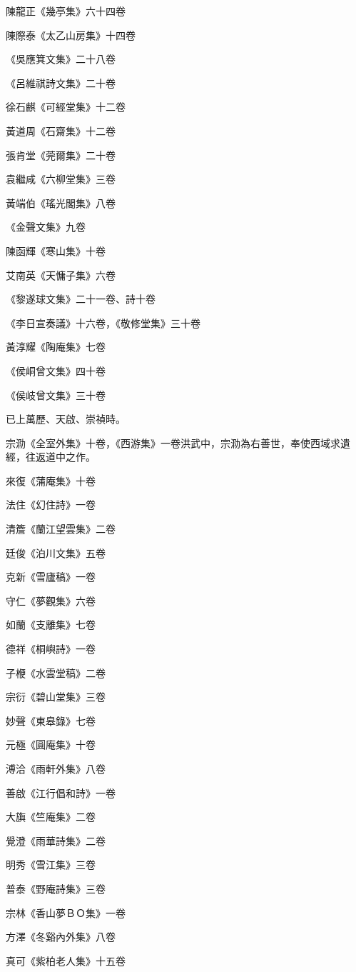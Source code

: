 陳龍正《幾亭集》六十四卷

陳際泰《太乙山房集》十四卷

《吳應箕文集》二十八卷

《呂維祺詩文集》二十卷

徐石麒《可經堂集》十二卷

黃道周《石齋集》十二卷

張肯堂《莞爾集》二十卷

袁繼咸《六柳堂集》三卷

黃端伯《瑤光閣集》八卷

《金聲文集》九卷

陳函輝《寒山集》十卷

艾南英《天慵子集》六卷

《黎遂球文集》二十一卷、詩十卷

《李日宣奏議》十六卷，《敬修堂集》三十卷

黃淳耀《陶庵集》七卷

《侯峒曾文集》四十卷

《侯岐曾文集》三十卷

已上萬歷、天啟、崇禎時。

宗泐《全室外集》十卷，《西游集》一卷洪武中，宗泐為右善世，奉使西域求遺經，往返道中之作。

來復《蒲庵集》十卷

法住《幻住詩》一卷

清簷《蘭江望雲集》二卷

廷俊《泊川文集》五卷

克新《雪廬稿》一卷

守仁《夢觀集》六卷

如蘭《支離集》七卷

德祥《桐嶼詩》一卷

子楩《水雲堂稿》二卷

宗衍《碧山堂集》三卷

妙聲《東皋錄》七卷

元極《圓庵集》十卷

溥洽《雨軒外集》八卷

善啟《江行倡和詩》一卷

大旟《竺庵集》二卷

覺澄《雨華詩集》二卷

明秀《雪江集》三卷

普泰《野庵詩集》三卷

宗林《香山夢ＢＯ集》一卷

方澤《冬谿內外集》八卷

真可《紫柏老人集》十五卷

